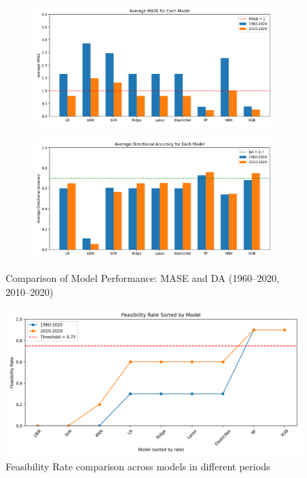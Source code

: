 \documentclass[12pt]{article}
\begin{document}
\begin{figure}[h]
    \centering
    \begin{subfigure}[b]{0.48\textwidth}
        \centering
        \includegraphics[width=\linewidth]{Average_MASE_figure2.png}
        \label{fig:MASE}
    \end{subfigure}
    \hfill
    \begin{subfigure}[b]{0.48\textwidth}
        \centering
        \includegraphics[width=\linewidth]{Average_DA_figure2.png}
        \label{fig:DA}
    \end{subfigure}
    \caption{Comparison of Model Performance: MASE and DA (1960–2020, 2010–2020)}
    \label{fig:model_compare_2}
\end{figure}
\begin{figure}[h]
    \centering
    \includegraphics[width=0.8\linewidth]{Feasibility_Rate_Line_Overlay_figure3.png}
    \caption{Feasibility Rate comparison across models in different periods}
    \label{fig:FR}
\end{figure}
\end{document}
